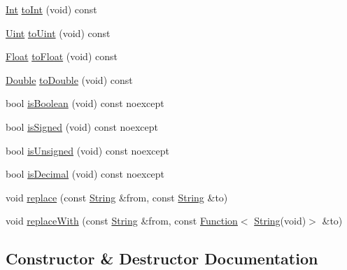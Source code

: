 \begin{DoxyCompactItemize}
\item 
\mbox{\hyperlink{namespaceo_a_aa575525a7b0116822c73d43fa671a58c}{Int}} \mbox{\hyperlink{classo_a_1_1_string_a8aab531770e6d4abe2a3e85d55f69ead}{to\+Int}} (void) const
\item 
\mbox{\hyperlink{namespaceo_a_abe1d8250226c5cf34f84d7b75fc7922e}{Uint}} \mbox{\hyperlink{classo_a_1_1_string_a959f6a81bf2fa3e6fa001642608e2af2}{to\+Uint}} (void) const
\item 
\mbox{\hyperlink{namespaceo_a_a513e9cb16924b482268ab3fcdf1f2499}{Float}} \mbox{\hyperlink{classo_a_1_1_string_a109668ec1795a27a5c44b33ec53e56a3}{to\+Float}} (void) const
\item 
\mbox{\hyperlink{namespaceo_a_a2bcc976232176d2dcf8b9df1fa33c038}{Double}} \mbox{\hyperlink{classo_a_1_1_string_a609bc93f4fdb26cc79d26747741af787}{to\+Double}} (void) const
\item 
bool \mbox{\hyperlink{classo_a_1_1_string_af57b0b992d2ce2995f3f843d7dd36e96}{is\+Boolean}} (void) const noexcept
\item 
bool \mbox{\hyperlink{classo_a_1_1_string_ac88615009b2cdba26d1bf42187a66eb7}{is\+Signed}} (void) const noexcept
\item 
bool \mbox{\hyperlink{classo_a_1_1_string_aeb851821fb8dd5ca72d50413f72bb1a4}{is\+Unsigned}} (void) const noexcept
\item 
bool \mbox{\hyperlink{classo_a_1_1_string_a30effa3311ecb3f5f29e8d670709f436}{is\+Decimal}} (void) const noexcept
\item 
void \mbox{\hyperlink{classo_a_1_1_string_a54760c3b5fee78fbcc28a6d81dbfe6b3}{replace}} (const \mbox{\hyperlink{classo_a_1_1_string}{String}} \&from, const \mbox{\hyperlink{classo_a_1_1_string}{String}} \&to)
\item 
void \mbox{\hyperlink{classo_a_1_1_string_a9f974d8b83a0ae4232a33d249291f3c4}{replace\+With}} (const \mbox{\hyperlink{classo_a_1_1_string}{String}} \&from, const \mbox{\hyperlink{namespaceo_a_a85bea86b9d05d2b86c77d8ee5b7bbde5}{Function}}$<$ \mbox{\hyperlink{classo_a_1_1_string}{String}}(void)$>$ \&to)
\end{DoxyCompactItemize}


\subsection{Constructor \& Destructor Documentation}
\mbox{\label{classo_a_1_1_string_a10ce41917f151b304f0b465c1ff1ec6e}} 
